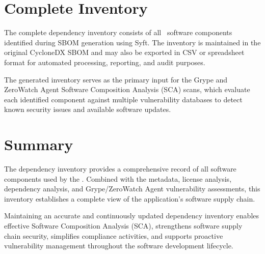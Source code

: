 \vspace{0.4cm}


\section{Complete Inventory}

The complete dependency inventory consists of all \TotalComponents\ software components identified during SBOM generation using Syft. The inventory is maintained in the original CycloneDX SBOM and may also be exported in CSV or spreadsheet format for automated processing, reporting, and audit purposes.

The generated inventory serves as the primary input for the Grype and ZeroWatch Agent Software Composition Analysis (SCA) scans, which evaluate each identified component against multiple vulnerability databases to detect known security issues and available software updates.

\vspace{0.4cm}


\section{Summary}

The dependency inventory provides a comprehensive record of all software components used by the \textbf{\ProjectName}. Combined with the metadata, license analysis, dependency analysis, and Grype/ZeroWatch Agent vulnerability assessments, this inventory establishes a complete view of the application's software supply chain.

Maintaining an accurate and continuously updated dependency inventory enables effective Software Composition Analysis (SCA), strengthens software supply chain security, simplifies compliance activities, and supports proactive vulnerability management throughout the software development lifecycle.